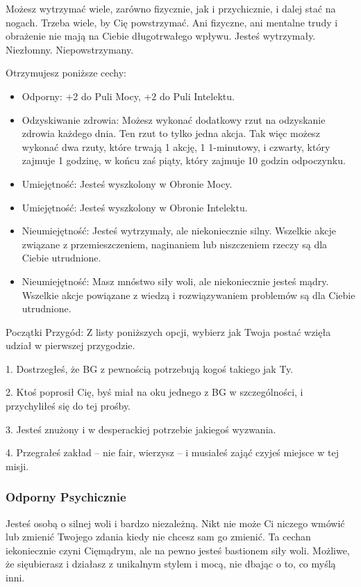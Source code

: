 Możesz wytrzymać wiele, zarówno fizycznie, jak i przychicznie, i dalej stać na nogach. Trzeba wiele, by Cię powstrzymać. Ani fizyczne, ani mentalne trudy i obrażenie nie mają na Ciebie długotrwałego wpływu. Jesteś wytrzymały. Niezłomny. Niepowstrzymany. 

Otrzymujesz poniższe cechy:
\begin{itemize}
    \item  Odporny: +2 do Puli Mocy, +2 do Puli Intelektu.
    \item  Odzyskiwanie zdrowia: Możesz wykonać dodatkowy rzut na odzyskanie zdrowia każdego dnia. Ten rzut to tylko jedna akcja. Tak więc możesz wykonać dwa rzuty, które trwają 1 akcję, 1 1-minutowy, i czwarty, który zajmuje 1 godzinę, w końcu zaś piąty, który zajmuje 10 godzin odpoczynku.
    \item  Umiejętność: Jesteś wyszkolony w Obronie Mocy.
    \item  Umiejętność: Jesteś wyszkolony w Obronie Intelektu.
    \item  Nieumiejętność: Jesteś wytrzymały, ale niekoniecznie silny. Wszelkie akcje związane z przemieszczeniem, naginaniem lub niszczeniem rzeczy są dla Ciebie utrudnione.
    \item  Nieumiejętność: Masz mnóstwo siły woli, ale niekoniecznie jesteś mądry. Wszelkie akcje powiązane z wiedzą i rozwiązywaniem problemów są dla Ciebie utrudnione.
\end{itemize}

Początki Przygód: Z listy poniższych opcji, wybierz jak Twoja postać wzięła udział w pierwszej przygodzie.

1. Dostrzegłeś, że BG z pewnością potrzebują kogoś takiego jak Ty.

2. Ktoś poprosił Cię, byś miał na oku jednego z BG w szczególności, i przychyliłeś się do tej prośby.

3. Jesteś znużony i w desperackiej potrzebie jakiegoś wyzwania.

4. Przegrałeś zakład – nie fair, wierzysz – i musiałeś zająć czyjeś miejsce w tej misji.

\subsubsection{Odporny Psychicznie}

Jesteś osobą o silnej woli i bardzo niezależną. Nikt nie może Ci niczego wmówić lub zmienić Twojego zdania kiedy nie chcesz sam go zmienić. Ta cechan iekoniecznie czyni Cięmądrym, ale na pewno jesteś bastionem siły woli. Możliwe, że sięubierasz i działasz z unikalnym stylem i mocą, nie dbając o to, co myślą inni. 


